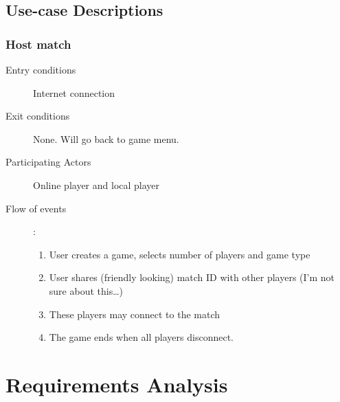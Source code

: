 \documentclass[12pt]{article}
\begin{document}
\subsection{Use-case Descriptions}
\begin{mdframed}
    \subsubsection{Host match}
    \begin{description}
        \item[Entry conditions] Internet connection
        \item[Exit conditions] None. Will go back to game menu.
        \item[Participating Actors] Online player and local player
        \item[Flow of events]:
            \begin{enumerate}
                \item User creates a game, selects number of players and game
                    type
                \item User shares (friendly looking) match ID with other
                    players (I’m not sure about this…)
                \item These players may connect to the match
                \item The game ends when all players disconnect.
            \end{enumerate}
    \end{description}
\end{mdframed}




\section{Requirements Analysis}
\end{document}
